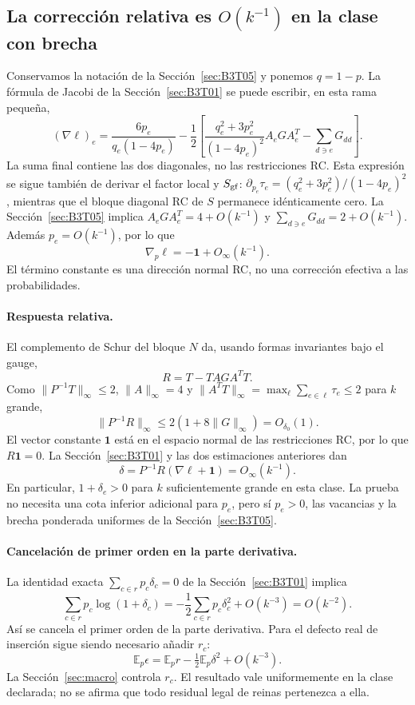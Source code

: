 \subsection{La corrección relativa es \texorpdfstring{$O(k^{-1})$}{O(1/k)} en la clase con
brecha}\label{sec:B3T06}
Conservamos la notación de la Sección~\ref{sec:B3T05} y ponemos $q=1-p$.
La fórmula de Jacobi de la Sección~\ref{sec:B3T01} se puede escribir, en esta rama pequeña,
\[
 (\nabla\ell)_e=\frac{6p_e}{q_e(1-4p_e)}
 -\frac12\left[
 \frac{q_e^2+3p_e^2}{(1-4p_e)^2}A_eGA_e^T
 -\sum_{d\ni e}G_{dd}\right].
\]
La suma final contiene las dos diagonales, no las restricciones RC.
Esta expresión se sigue también de derivar el factor local y $S_{\rm gf}$:
$\partial_{p_e}\tau_e=(q_e^2+3p_e^2)/(1-4p_e)^2$,
mientras que el bloque diagonal RC de $S$ permanece idénticamente cero.
La Sección~\ref{sec:B3T05} implica $A_eGA_e^T=4+O(k^{-1})$ y
$\sum_{d\ni e}G_{dd}=2+O(k^{-1})$.
Además $p_e=O(k^{-1})$, por lo que
\[
 \boxed{\nabla_p\ell=-\mathbf1+O_\infty(k^{-1}).}
\]
El término constante es una dirección normal RC, no una corrección
efectiva a las probabilidades.

\paragraph{Respuesta relativa.}
El complemento de Schur del bloque $N$ da, usando formas invariantes
bajo el gauge,
\[
 R=T-TAG A^TT.
\]
Como $\|P^{-1}T\|_\infty\le2$, $\|A\|_\infty=4$ y
$\|A^TT\|_\infty=\max_\ell\sum_{e\in\ell}\tau_e\le2$ para $k$ grande,
\[
 \|P^{-1}R\|_\infty
 \le2(1+8\|G\|_\infty)=O_{\delta_0}(1).
\]
El vector constante $\mathbf1$ está en el espacio normal de las restricciones
RC, por lo que $R\mathbf1=0$. La Sección~\ref{sec:B3T01} y las dos estimaciones anteriores dan
\[
 \boxed{\delta=P^{-1}R(\nabla\ell+\mathbf1)=O_\infty(k^{-1}).}
\]
En particular, $1+\delta_e>0$ para $k$ suficientemente grande en esta clase.
La prueba no necesita una cota inferior adicional para $p_e$, pero sí
$p_e>0$, las vacancias y la brecha ponderada uniformes de la Sección~\ref{sec:B3T05}.

\paragraph{Cancelación de primer orden en la parte derivativa.}
La identidad exacta $\sum_{c\in r}p_c\delta_c=0$ de la Sección~\ref{sec:B3T01} implica
\[
 \sum_{c\in r}p_c\log(1+\delta_c)
 =-\frac12\sum_{c\in r}p_c\delta_c^2+O(k^{-3})=O(k^{-2}).
\]
Así se cancela el primer orden de la parte derivativa. Para el defecto
real de inserción sigue siendo necesario añadir $r_c$:
\[
 \mathbb E_p\epsilon
 =\mathbb E_p r-\tfrac12\mathbb E_p\delta^2+O(k^{-3}).
\]
La Sección~\ref{sec:macro} controla $r_c$. El resultado vale
uniformemente en la clase declarada; no se afirma que todo residual legal
de reinas pertenezca a ella.
